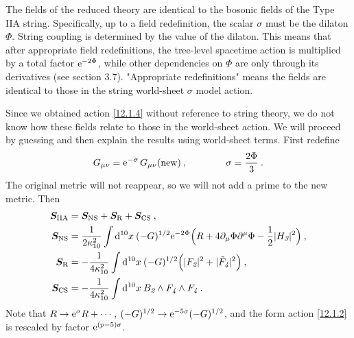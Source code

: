 The fields of the reduced theory are identical to the bosonic fields of the Type IIA string. Specifically, up to a field redefinition, the scalar $\sigma$ must be the dilaton $\Phi$. String coupling is determined by the value of the dilaton. This means that after appropriate field redefinitions, the tree-level spacetime action is multiplied by a total factor $\mathrm{e}^{-2\Phi}$, while other dependencies on $\Phi$ are only through its derivatives (see section 3.7). "Appropriate redefinitions" means the fields are identical to those in the string world-sheet $\sigma$ model action.

Since we obtained action \eqref{12.1.4} without reference to string theory, we do not know how these fields relate to those in the world-sheet action. We will proceed by guessing and then explain the results using world-sheet terms. First redefine
\begin{equation}
	G_{\mu\nu}=\mathrm{e}^{-\sigma}\,G_{\mu\nu}(\text{new})\:, \qquad \qquad \sigma=\frac{2\Phi}{3}\:.\label{12.1.9}
\end{equation}
The original metric will not reappear, so we will not add a prime to the new metric. Then
\begin{subequations}
	\begin{align}
		\bm{S}_{\text{IIA}} &= \bm{S}_{\text{NS}}+ \bm{S}_{\text{R}}+\bm{S}_{\text{CS}} \:, \label{12.1.10a} \\
		\bm{S}_{\text{NS}} &= \frac{1}{2\kappa_{10}^{2}}\int \mathrm{d}^{10}x\: (-G)^{1/2}\mathrm{e}^{-2\Phi}\Bigl(R+4\partial_{\mu}\Phi\partial^{\mu}\Phi-\frac{1}{2}\lvert H_{\textit{3}}\rvert^{2} \Bigr) \:,  \label{12.1.10b} \\
		\bm{S}_{\text{R}}&=-\frac{1}{4\kappa_{10}^{2}}\int\mathrm{d}^{10}x\:(-G)^{1/2}\Bigl(\lvert F_{\textit{2}}\rvert^{2}+\lvert \tilde{F}_{\textit{4}}\rvert^{2}\Bigr) \:, \label{12.1.10c}\\
		\bm{S}_{\text{CS}}&=-\frac{1}{4\kappa_{10}^{2}}\int\mathrm{d}^{10}x\:B_{\textit{2}}\wedge
		F_{\textit{4}}\wedge F_{\textit{4}} \:. \label{12.1.10d}
	\end{align} \label{12.1.10}
\end{subequations}
Note that $R\to \mathrm{e}^{\sigma}R+\cdots$, $(-G)^{1/2}\to \mathrm{e}^{-5\sigma}(-G)^{1/2}$, and the form action \eqref{12.1.2} is rescaled by factor $\mathrm{e}^{(p-5)\sigma}$.
